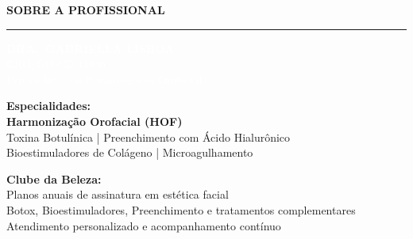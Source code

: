 \documentclass[12pt, a4paper]{article}
\begin{document}
\begin{center}
    {\Huge \textcolor{primaryColor}{\textbf{SOBRE A PROFISSIONAL}}} \\
    \vspace{1cm}
    \rule{12cm}{1.5pt}
    \vspace{1cm}

    \colorbox{accentColor}{%
        \parbox{0.92\textwidth}{%
            \centering
            \vspace{0.8cm}
            \textcolor{white}{\Huge \textbf{DRA.\ GABRIELLA LISBOA}} \\
            \vspace{0.3cm}
            \textcolor{white}{\Large CRO/GO-CD 11836} \\
            \vspace{0.2cm}
            \textcolor{white}{\large Especialista em Harmonização Orofacial} \\
            \vspace{0.8cm}
        }%
    }

    \vspace{1cm}

    \begin{flushleft}
    \large
    \textbf{Especialidades:} \\
    \vspace{0.3cm}
    \hspace{1cm} \textcolor{primaryColor}{\Large \textbf{Harmonização Orofacial (HOF)}} \\
    \hspace{1cm} \textcolor{secondaryText}{Toxina Botulínica | Preenchimento com Ácido Hialurônico} \\
    \hspace{1cm} \textcolor{secondaryText}{Bioestimuladores de Colágeno | Microagulhamento} \\

    \vspace{1cm}

    \textbf{Clube da Beleza:} \\
    \vspace{0.3cm}
    \hspace{1cm} \textcolor{secondaryText}{Planos anuais de assinatura em estética facial} \\
    \hspace{1cm} \textcolor{secondaryText}{Botox, Bioestimuladores, Preenchimento e tratamentos complementares} \\
    \hspace{1cm} \textcolor{secondaryText}{Atendimento personalizado e acompanhamento contínuo} \\
    \end{flushleft}


\end{center}
\end{document}
